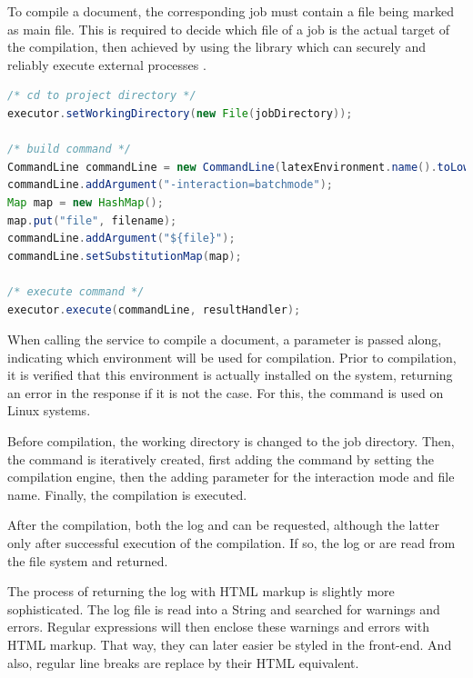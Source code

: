 
To compile a document, the corresponding job must contain a file being marked as main  file. This is required to decide which file of a job is the actual target of the compilation, then achieved by using the  library which can securely and reliably execute external processes \cite{website:apache-commons-exec}.

\pagebreak

\begin{lstlisting}[language=Java, caption=Executing the Compilation of \LaTeX Files by Command Line]
/* cd to project directory */
executor.setWorkingDirectory(new File(jobDirectory));

/* build command */
CommandLine commandLine = new CommandLine(latexEnvironment.name().toLowerCase());
commandLine.addArgument("-interaction=batchmode");
Map map = new HashMap();
map.put("file", filename);
commandLine.addArgument("${file}");
commandLine.setSubstitutionMap(map);

/* execute command */
executor.execute(commandLine, resultHandler);
\end{lstlisting}

When calling the service to compile a document, a parameter is passed along, indicating which environment will be used for compilation. Prior to compilation, it is verified that this environment is actually installed on the system, returning an error in the response if it is not the case. For this, the  command is used on Linux systems.

Before compilation, the working directory is changed to the job directory. Then, the command is iteratively created, first adding the command by setting the compilation engine, then the adding parameter for the interaction mode and file name. Finally, the compilation is executed.


After the compilation, both the log and  can be requested, although the latter only after successful execution of the compilation. If so, the log or  are read from the file system and returned. 

The process of returning the log with HTML markup is slightly more sophisticated. The log file is read into a String and searched for warnings and errors. Regular expressions will then enclose these warnings and errors with HTML markup. That way, they can later easier be styled in the front-end. And also, regular line breaks are replace by their HTML equivalent.

